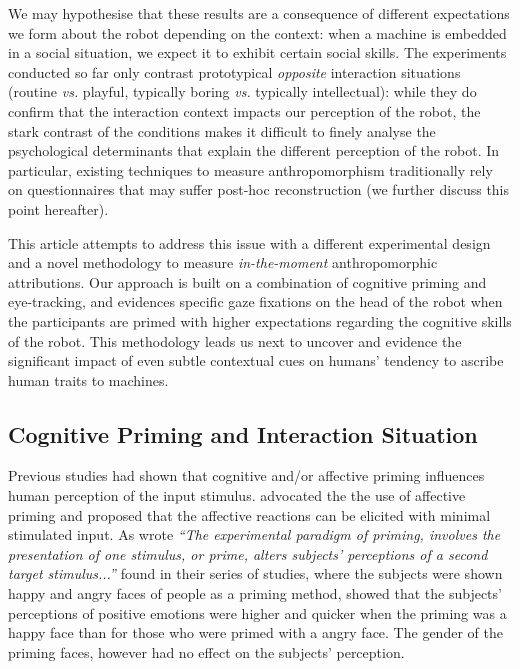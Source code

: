 \documentclass[lettersize, noapacite, twoside, HRI]{apa_HRI}
\newcommand{\vs}{\textit{vs.}\xspace}
\begin{document}
We may hypothesise that these results are a consequence of different
expectations we form about the robot depending on the context: when a machine is
embedded in a social situation, we expect it to exhibit certain
social skills. The experiments conducted so far only contrast prototypical
\emph{opposite} interaction situations (routine \vs playful, typically boring \vs typically
intellectual): while they do confirm that the interaction context impacts our
perception of the robot, the stark contrast of the conditions makes it difficult
to finely analyse the psychological determinants that explain the different
perception of the robot. In particular, existing
techniques to measure anthropomorphism traditionally rely on questionnaires that
may suffer post-hoc reconstruction (we further discuss this point hereafter).

This article attempts to address this issue with a different experimental design
and a novel methodology to measure \emph{in-the-moment} anthropomorphic attributions.
Our approach is built on a combination of cognitive priming and eye-tracking,
and evidences specific gaze fixations on the head of the robot when the
participants are primed with higher expectations regarding the cognitive skills
of the robot. This methodology leads us next to uncover and evidence the significant
impact of even subtle contextual cues on humans' tendency to ascribe human
traits to machines.



\subsection{Cognitive Priming and Interaction Situation}

Previous studies had shown that cognitive and/or affective priming influences human perception of the input stimulus. \cite{zajonc1980feeling} advocated the the use of affective priming and proposed that the affective reactions can be elicited with minimal stimulated input. As \cite{murphy1993affect} wrote \textit{``The experimental paradigm of priming, involves the presentation of one stimulus, or prime, alters subjects' perceptions of a second target stimulus...''}  \cite{murphy1993affect} found in their series of studies, where the subjects were shown happy and angry faces of people as a priming method, showed that the subjects' perceptions of positive emotions were higher and quicker when the priming was a happy face than for those who were primed with a angry face. The gender of the priming faces, however had no effect on the subjects' perception.
\end{document}
